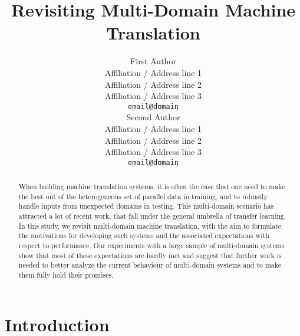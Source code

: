 \documentclass[11pt,a4paper]{article}
\title{Revisiting Multi-Domain Machine Translation}
\author{First Author \\
  Affiliation / Address line 1 \\
  Affiliation / Address line 2 \\
  Affiliation / Address line 3 \\
  {\tt email@domain} \\\And
  Second Author \\
  Affiliation / Address line 1 \\
  Affiliation / Address line 2 \\
  Affiliation / Address line 3 \\
  {\tt email@domain} \\}
\date{}
\newcommand{\fyDone}[1]{\done[FY]\Todo[FY:]{\textcolor{orange}{#1}}}
\begin{document}
\maketitle
\begin{abstract}
  When building machine translation systems, it is often the case that one need to make the best out of the heterogeneous set of parallel data in training, and to robustly handle inputs from unexpected domains in testing. This multi-domain scenario has attracted a lot of recent work, that fall under the general umbrella of transfer learning.
In this study, we revisit multi-domain machine translation, with the aim to formulate the motivations for developing such systems and the associated expectations with respect to performance. Our experiments with a large sample of multi-domain systems show that most of these expectations are hardly met and suggest that further work is needed to better analyze the current behaviour of multi-domain systems and to make them fully hold their promises.
  \fyDone{Write abstract}
\end{abstract}

\section{Introduction} \label{sec:intro}

%
% 
\end{document}
